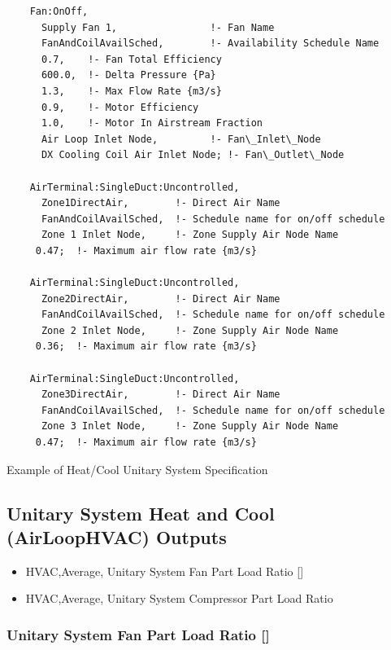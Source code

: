 \begin{lstlisting}
    Fan:OnOff,
      Supply Fan 1,                !- Fan Name
      FanAndCoilAvailSched,        !- Availability Schedule Name
      0.7,    !- Fan Total Efficiency
      600.0,  !- Delta Pressure {Pa}
      1.3,    !- Max Flow Rate {m3/s}
      0.9,    !- Motor Efficiency
      1.0,    !- Motor In Airstream Fraction
      Air Loop Inlet Node,         !- Fan\_Inlet\_Node
      DX Cooling Coil Air Inlet Node; !- Fan\_Outlet\_Node

    AirTerminal:SingleDuct:Uncontrolled,
      Zone1DirectAir,        !- Direct Air Name
      FanAndCoilAvailSched,  !- Schedule name for on/off schedule
      Zone 1 Inlet Node,     !- Zone Supply Air Node Name
     0.47;  !- Maximum air flow rate {m3/s}

    AirTerminal:SingleDuct:Uncontrolled,
      Zone2DirectAir,        !- Direct Air Name
      FanAndCoilAvailSched,  !- Schedule name for on/off schedule
      Zone 2 Inlet Node,     !- Zone Supply Air Node Name
     0.36;  !- Maximum air flow rate {m3/s}

    AirTerminal:SingleDuct:Uncontrolled,
      Zone3DirectAir,        !- Direct Air Name
      FanAndCoilAvailSched,  !- Schedule name for on/off schedule
      Zone 3 Inlet Node,     !- Zone Supply Air Node Name
     0.47;  !- Maximum air flow rate {m3/s}
\end{lstlisting}

Example of Heat/Cool Unitary System Specification

\subsection{Unitary System Heat and Cool (AirLoopHVAC) Outputs}\label{unitary-system-heat-and-cool-airloophvac-outputs}

\begin{itemize}
\item
  HVAC,Average, Unitary System Fan Part Load Ratio {[]}
\item
  HVAC,Average, Unitary System Compressor Part Load Ratio
\end{itemize}

\subsubsection{\texorpdfstring{Unitary System Fan Part Load Ratio {[]}}{Unitary System Fan Part Load Ratio }}\label{unitary-system-fan-part-load-ratio-2}


